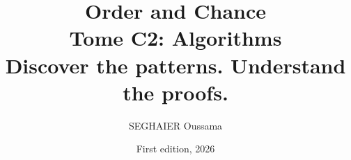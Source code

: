 \documentclass[11pt,openany]{book}
\title{\Huge\textbf{Order and Chance}\\[0.4em]\LARGE Tome C2: Algorithms\\[0.6em]
\Large Discover the patterns. Understand the proofs.}
\author{SEGHAIER Oussama}
\date{First edition, 2026}
\begin{document}
\frontmatter
\makecover
\maketitle

\tableofcontents

\mainmatter













\end{document}
